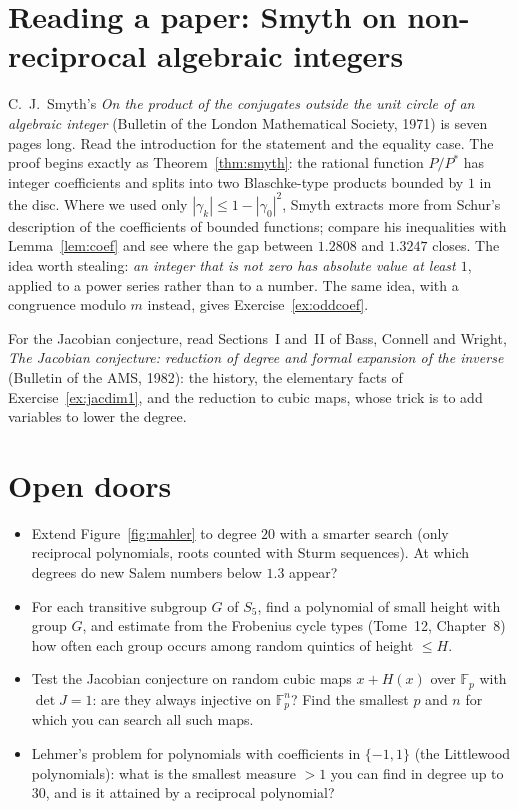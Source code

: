\section{Reading a paper: Smyth on non-reciprocal algebraic integers}

C.~J.~Smyth's \emph{On the product of the conjugates outside the unit circle of an algebraic integer} (Bulletin of the London Mathematical Society, 1971) is
seven pages long. Read the introduction for the statement and the equality case. The proof begins exactly as Theorem~\ref{thm:smyth}: the rational function
$P/P^*$ has integer coefficients and splits into two Blaschke-type products bounded by $1$ in the disc. Where we used only $|\gamma_k|\le1-|\gamma_0|^2$,
Smyth extracts more from Schur's description of the coefficients of bounded functions; compare his inequalities with
Lemma~\ref{lem:coef} and see where the gap between $1.2808$ and $1.3247$ closes. The idea worth stealing: \emph{an integer that is not zero has absolute
value at least $1$}, applied to a power series rather than to a number. The same idea, with a congruence modulo $m$ instead, gives Exercise~\ref{ex:oddcoef}.

For the Jacobian conjecture, read Sections~I and~II of Bass, Connell and Wright, \emph{The Jacobian conjecture: reduction of degree and formal expansion
of the inverse} (Bulletin of the AMS, 1982): the history, the elementary facts of Exercise~\ref{ex:jacdim1}, and the reduction to cubic maps, whose trick is
to add variables to lower the degree.

\section{Open doors}

\begin{itemize}
\item Extend Figure~\ref{fig:mahler} to degree $20$ with a smarter search (only reciprocal polynomials, roots counted with Sturm sequences). At which degrees
do new Salem numbers below $1.3$ appear?
\item For each transitive subgroup $G$ of $S_5$, find a polynomial of small height with group $G$, and estimate from the Frobenius cycle types (Tome~12,
Chapter~8) how often each group occurs among random quintics of height $\le H$.
\item Test the Jacobian conjecture on random cubic maps $x+H(x)$ over $\mathbb F_p$ with $\det J=1$: are they always injective on $\mathbb F_p^n$? Find the
smallest $p$ and $n$ for which you can search all such maps.
\item Lehmer's problem for polynomials with coefficients in $\{-1,1\}$ (the Littlewood polynomials): what is the smallest measure $>1$ you can find in
degree up to $30$, and is it attained by a reciprocal polynomial?
\end{itemize}

